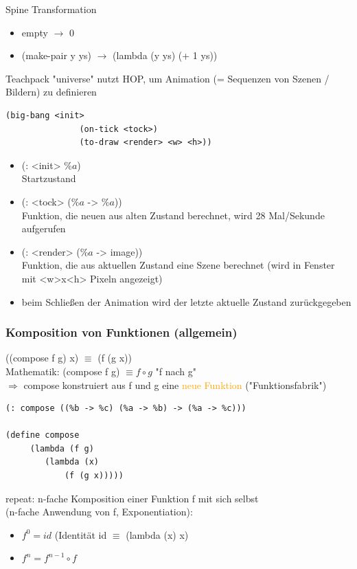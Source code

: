 \documentclass[paper=a4, fontsize=11pt]{scrartcl}
\numberwithin{equation}{section}
\numberwithin{figure}{section}
\numberwithin{table}{section}
\begin{document}
\begin{lstlistig}
Spine Transformation \\
\begin{itemize}
\item empty $\rightarrow$ 0
\item (make-pair y ys) $\rightarrow$ (lambda (y ys) (+ 1 ys))
\end{itemize}

Teachpack "universe" nutzt HOP, um Animation (= Sequenzen von Szenen / Bildern) zu definieren \\
\begin{lstlisting}
(big-bang <init>
               (on-tick <tock>)
               (to-draw <render> <w> <h>))
\end{lstlisting}

\begin{itemize}
\item (: <init> $\%a$) \\
         Startzustand
\item (: <tock> ($\%a$ -> $\%a$)) \\
         Funktion, die neuen aus alten Zustand berechnet, wird 28 Mal/Sekunde aufgerufen
\item (: <render> ($\%a$ -> image)) \\
         Funktion, die aus aktuellen Zustand eine Szene berechnet (wird in Fenster mit <w>x<h> Pixeln angezeigt)
\item beim Schließen der Animation wird der letzte aktuelle Zustand zurückgegeben
\end{itemize}
\subsubsection{Komposition von Funktionen (allgemein)}

((compose f g) x) $\equiv$ (f (g x)) \\
Mathematik: (compose f g) $\equiv f \circ g$ "f nach g" \\
$\Rightarrow$ compose konstruiert aus f und g eine \textcolor{orange}{neue Funktion} ("Funktionsfabrik") \\

\begin{lstlisting}
(: compose ((%b -> %c) (%a -> %b) -> (%a -> %c)))

(define compose
     (lambda (f g)
        (lambda (x)
            (f (g x)))))
\end{lstlisting}

repeat: n-fache Komposition einer Funktion f mit sich selbst \\
(n-fache Anwendung von f, Exponentiation): \\
\begin{itemize}
\item $f^{0} = id$ (Identität id $\equiv$ (lambda (x) x)
\item $f^{n} = f^{n-1} \circ f$
\end{itemize}


\end{lstlistig}
\end{document}
